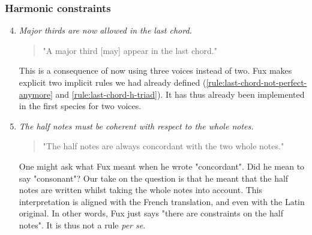 \subsubsection{Harmonic constraints}
\begin{enumerate}[wide, label=\bfseries 2.H\arabic*]
\setcounter{enumi}{3} %
    \item \textit{Major thirds are now allowed in the last chord.} \label{rule:major-third-last-chord}    
    \begin{quotation}
        "A major third [may] appear in the last chord."
        \textcite[p.87]{GaPEng}
    \end{quotation}
    This is a consequence of now using three voices instead of two. Fux makes explicit two implicit rules we had already defined (\ref{rule:last-chord-not-perfect-anymore} and \ref{rule:last-chord-h-triad}). It has thus already been implemented in the first species for two voices.

    \item \textit{The half notes must be coherent with respect to the whole notes.} \label{rule:concur-2nd}    
    \begin{quotation}
        "The half notes are always concordant with the two whole notes."
        \textcite[p.88]{GaPEng}
    \end{quotation}
    One might ask what Fux meant when he wrote "concordant". Did he mean to say "consonant"? Our take on the question is that he meant that the half notes are written whilst taking the whole notes into account. This interpretation is aligned with the French translation, and even with the Latin original. In other words, Fux just says "there are constraints on the half notes". It is thus not a rule \textit{per se}.
\end{enumerate}

